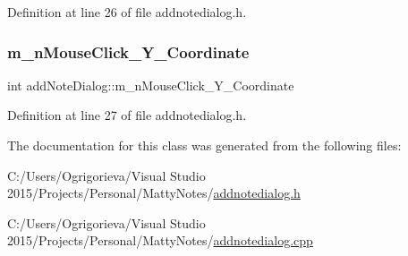 Definition at line 26 of file addnotedialog.\+h.

\hypertarget{classaddNoteDialog_aeb0351ab1bbcc76899f21224ddf4d374}{}\label{classaddNoteDialog_aeb0351ab1bbcc76899f21224ddf4d374} 
\subsubsection{\texorpdfstring{m\+\_\+n\+Mouse\+Click\+\_\+\+Y\+\_\+\+Coordinate}{m\_nMouseClick\_Y\_Coordinate}}
{\footnotesize\ttfamily int add\+Note\+Dialog\+::m\+\_\+n\+Mouse\+Click\+\_\+\+Y\+\_\+\+Coordinate\hspace{0.3cm}{\ttfamily [private]}}



Definition at line 27 of file addnotedialog.\+h.



The documentation for this class was generated from the following files\+:\begin{DoxyCompactItemize}
\item 
C\+:/\+Users/\+Ogrigorieva/\+Visual Studio 2015/\+Projects/\+Personal/\+Matty\+Notes/\hyperlink{addnotedialog_8h}{addnotedialog.\+h}\item 
C\+:/\+Users/\+Ogrigorieva/\+Visual Studio 2015/\+Projects/\+Personal/\+Matty\+Notes/\hyperlink{addnotedialog_8cpp}{addnotedialog.\+cpp}\end{DoxyCompactItemize}
